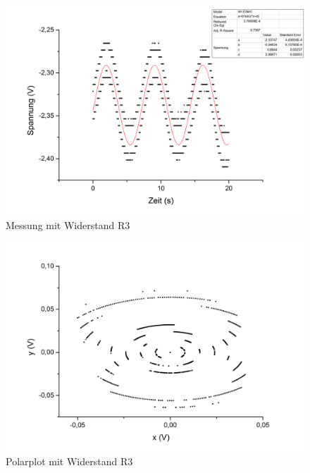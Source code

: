 \begin{figure}[h]
\begin{center}
\includegraphics[scale=0.6]{Bilder/w3}
\caption{Messung mit Widerstand R3}
\end{center}
\end{figure}
\begin{figure}[h]
\begin{center}
\includegraphics[scale=0.6]{Bilder/pw3}
\caption{Polarplot mit Widerstand R3}
\end{center}
\end{figure}
